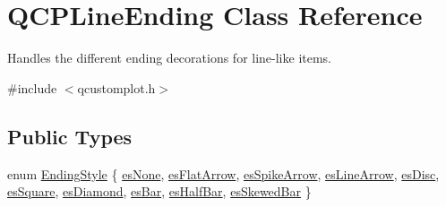 \hypertarget{class_q_c_p_line_ending}{}\section{Q\+C\+P\+Line\+Ending Class Reference}
\label{class_q_c_p_line_ending}


Handles the different ending decorations for line-\/like items.  




{\ttfamily \#include $<$qcustomplot.\+h$>$}

\subsection*{Public Types}
\begin{DoxyCompactItemize}
\item 
enum \hyperlink{class_q_c_p_line_ending_a5ef16e6876b4b74959c7261d8d4c2cd5}{Ending\+Style} \{ \newline
\hyperlink{class_q_c_p_line_ending_a5ef16e6876b4b74959c7261d8d4c2cd5aca12d500f50cd6871766801bac30fb03}{es\+None}, 
\hyperlink{class_q_c_p_line_ending_a5ef16e6876b4b74959c7261d8d4c2cd5a3d7dcea2f100671727c3417142154f8f}{es\+Flat\+Arrow}, 
\hyperlink{class_q_c_p_line_ending_a5ef16e6876b4b74959c7261d8d4c2cd5ab9964d0d03f812d1e79de15edbeb2cbf}{es\+Spike\+Arrow}, 
\hyperlink{class_q_c_p_line_ending_a5ef16e6876b4b74959c7261d8d4c2cd5a61f78ee8f375fb21cb9d250687bbcbd2}{es\+Line\+Arrow}, 
\newline
\hyperlink{class_q_c_p_line_ending_a5ef16e6876b4b74959c7261d8d4c2cd5ae5a3414916817258bcc6dddd605e8f5c}{es\+Disc}, 
\hyperlink{class_q_c_p_line_ending_a5ef16e6876b4b74959c7261d8d4c2cd5ae1836502fa43d8990bb62b2d493a140a}{es\+Square}, 
\hyperlink{class_q_c_p_line_ending_a5ef16e6876b4b74959c7261d8d4c2cd5a378fe5a8b768411b0bc1765210fe7200}{es\+Diamond}, 
\hyperlink{class_q_c_p_line_ending_a5ef16e6876b4b74959c7261d8d4c2cd5a2cf543bbca332df26d89bf779f50469f}{es\+Bar}, 
\newline
\hyperlink{class_q_c_p_line_ending_a5ef16e6876b4b74959c7261d8d4c2cd5a126c390f0c359fcd8df1fc5e38d26d5b}{es\+Half\+Bar}, 
\hyperlink{class_q_c_p_line_ending_a5ef16e6876b4b74959c7261d8d4c2cd5a2b2cc96e757ca9bcd91fb70221ed43ab}{es\+Skewed\+Bar}
 \}
\end{DoxyCompactItemize}

